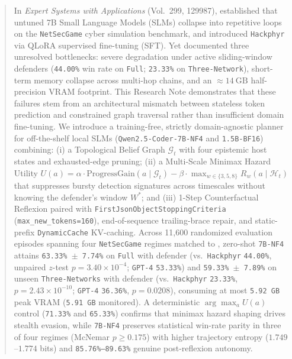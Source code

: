 \documentclass[a4paper,fleqn]{cas-dc}
\begin{document}
\begin{abstract}
In \emph{Expert Systems with Applications} (Vol.~299, 129987), \citet{rigaki2026building} established that untuned 7B Small Language Models (SLMs) collapse into repetitive loops on the \texttt{NetSecGame} cyber simulation benchmark, and introduced \texttt{Hackphyr} via QLoRA supervised fine-tuning (SFT). Yet \citet{rigaki2026building} documented three unresolved bottlenecks: severe degradation under active sliding-window defenders (\texttt{44.00\%} win rate on \texttt{Full}; \texttt{23.33\%} on \texttt{Three-Network}), short-term memory collapse across multi-hop chains, and an $\approx 14~\text{GB}$ half-precision VRAM footprint. This Research Note demonstrates that these failures stem from an architectural mismatch between stateless token prediction and constrained graph traversal rather than insufficient domain fine-tuning. We introduce a training-free, strictly domain-agnostic planner for off-the-shelf local SLMs (\texttt{Qwen2.5-Coder-7B-NF4} and \texttt{1.5B-BF16}) combining: (i) a Topological Belief Graph $\mathcal{G}_t$ with four epistemic host states and exhausted-edge pruning; (ii) a Multi-Scale Minimax Hazard Utility $U(a) = \alpha \cdot \mathrm{ProgressGain}(a \mid \mathcal{G}_t) - \beta \cdot \max_{w \in \{3,5,8\}} R_w(a \mid \mathcal{H}_t)$ that suppresses bursty detection signatures across timescales without knowing the defender's window $W^*$; and (iii) 1-Step Counterfactual Reflexion paired with \texttt{FirstJsonObjectStoppingCriteria} (\texttt{max\_new\_tokens=160}), end-of-sequence trailing-brace repair, and static-prefix \texttt{DynamicCache} KV-caching. Across 11,600 randomized evaluation episodes spanning four \texttt{NetSecGame} regimes matched to \citet{rigaki2026building}, zero-shot \texttt{7B-NF4} attains \texttt{63.33\% $\pm$ 7.74\%} on \texttt{Full} with defender (vs.\ \texttt{Hackphyr} \texttt{44.00\%}, unpaired $z$-test $p = 3.40 \times 10^{-4}$; \texttt{GPT-4} \texttt{53.33\%}) and \texttt{59.33\% $\pm$ 7.89\%} on unseen \texttt{Three-Networks} with defender (vs.\ \texttt{Hackphyr} \texttt{23.33\%}, $p = 2.43 \times 10^{-10}$; \texttt{GPT-4} \texttt{36.36\%}, $p = 0.0208$), consuming at most \texttt{5.92 GB} peak VRAM (\texttt{5.91 GB} monitored). A deterministic $\arg\max_a U(a)$ control (\texttt{71.33\%} and \texttt{65.33\%}) confirms that minimax hazard shaping drives stealth evasion, while \texttt{7B-NF4} preserves statistical win-rate parity in three of four regimes (McNemar $p \ge 0.175$) with higher trajectory entropy ($1.749$--$1.774$ bits) and \texttt{85.76\%--89.63\%} genuine post-reflexion autonomy.
\end{abstract}
\end{document}
